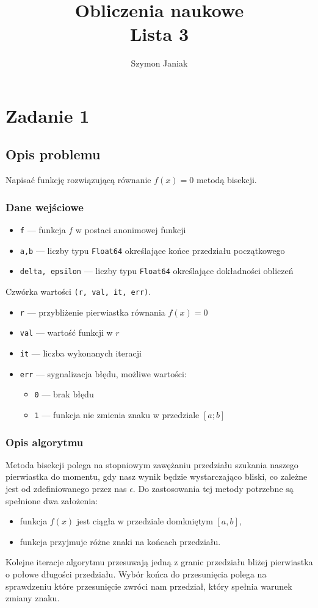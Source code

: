 \documentclass{article}
\title{%
	Obliczenia naukowe \\
	\large Lista 3}
\author{Szymon Janiak}
\begin{document}
\maketitle

\section*{Zadanie 1}
\subsection*{Opis problemu}
	Napisać funkcję rozwiązującą równanie $f(x) = 0$ metodą bisekcji.
\subsubsection*{Dane wejściowe}
	\begin{itemize}
	    \item \texttt{f} — funkcja $f$ w postaci anonimowej funkcji
	    \item \texttt{a,b} — liczby typu \texttt{Float64} określające końce przedziału początkowego
	    \item \texttt{delta, epsilon} — liczby typu \texttt{Float64} określające dokładności obliczeń
	\end{itemize}
	Czwórka wartości \texttt{(r, val, it, err)}.
	\begin{itemize}
	    \item \texttt{r} — przybliżenie pierwiastka równania $f(x) = 0$
	    \item \texttt{val} — wartość funkcji w $r$
	    \item \texttt{it} — liczba wykonanych iteracji
	    \item \texttt{err} — sygnalizacja błędu, możliwe wartości:
	    \begin{itemize}
	        \item \texttt{0} — brak błędu
	        \item \texttt{1} — funkcja nie zmienia znaku w przedziale $[a;b]$
	    \end{itemize}
	\end{itemize}
\subsubsection*{Opis algorytmu}
	Metoda bisekcji polega na stopniowym zawężaniu przedziału szukania naszego pierwiastka do momentu, gdy nasz wynik będzie wystarczająco bliski, co zależne jest od zdefiniowanego przez nas $\epsilon$.
	Do zastosowania tej metody potrzebne są spełnione dwa założenia:
	\begin{itemize}
		\item funkcja \texttt{$f(x)$} jest ciągła w przedziale domkniętym $[a, b]$,
		\item funkcja przyjmuje różne znaki na końcach przedziału.
	\end{itemize}
	Kolejne iteracje algorytmu przesuwają jedną z granic przedziału bliżej pierwiastka o połowe długości przedziału. Wybór końca do przesunięcia polega na sprawdzeniu które przesunięcie zwróci nam przedział, który spełnia warunek zmiany znaku.
\end{document}
